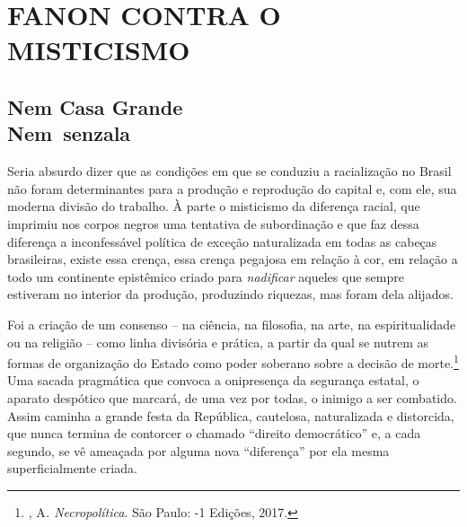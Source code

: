 \part{FANON CONTRA O MISTICISMO}
\removeepigraph

\chapter*{Nem Casa Grande\\ Nem~senzala}

Seria absurdo dizer que as condições em que se conduziu a racialização
no Brasil não foram determinantes para a produção e reprodução do
capital e, com ele, sua moderna divisão do trabalho. À parte o
misticismo da diferença racial, que imprimiu nos corpos negros uma
tentativa de subordinação e que faz dessa diferença a inconfessável
política de exceção naturalizada em todas as cabeças brasileiras, existe
essa crença, essa crença pegajosa em relação à cor, em relação a todo um
continente epistêmico criado para \emph{nadificar} aqueles que sempre
estiveram no interior da produção, produzindo riquezas, mas foram dela
alijados.

Foi a criação de um consenso -- na ciência, na filosofia, na arte, na
espiritualidade ou na religião -- como linha divisória e prática, a
partir da qual se nutrem as formas de organização do Estado como poder
soberano sobre a decisão de morte.\footnote{, A\emph{.
  Necropolítica}. São Paulo: -1 Edições, 2017.} Uma sacada
pragmática que convoca a onipresença da segurança estatal, o aparato
despótico que marcará, de uma vez por todas, o inimigo a ser combatido.
Assim caminha a grande festa da República, cautelosa, naturalizada e
distorcida, que nunca termina de contorcer o chamado ``direito
democrático'' e, a cada segundo, se vê ameaçada por alguma nova
``diferença'' por ela mesma superficialmente criada.

